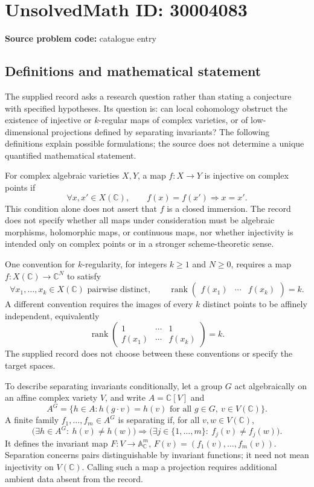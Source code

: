 \documentclass[11pt]{article}
\newcommand{\C}{\mathbb{C}}
\newcommand{\A}{\mathbb{A}}
\begin{document}
\section*{UnsolvedMath ID: 30004083}
\textbf{Source problem code:} catalogue entry
\subsection{Definitions and mathematical statement}
The supplied record asks a research question rather than stating a conjecture with specified hypotheses. Its question is: can local cohomology obstruct the existence of injective or \(k\)-regular maps of complex varieties, or of low-dimensional projections defined by separating invariants? The following definitions explain possible formulations; the source does not determine a unique quantified mathematical statement.

For complex algebraic varieties \(X,Y\), a map \(f:X\to Y\) is injective on complex points if
\[
\forall x,x'\in X(\C),\qquad f(x)=f(x')\Longrightarrow x=x'.
\]
This condition alone does not assert that \(f\) is a closed immersion. The record does not specify whether all maps under consideration must be algebraic morphisms, holomorphic maps, or continuous maps, nor whether injectivity is intended only on complex points or in a stronger scheme-theoretic sense.

One convention for \(k\)-regularity, for integers \(k\geq 1\) and \(N\geq 0\), requires a map \(f:X(\C)\to\C^N\) to satisfy
\[
\forall x_1,\ldots,x_k\in X(\C)\text{ pairwise distinct},\qquad
\operatorname{rank}\begin{pmatrix}f(x_1)&\cdots&f(x_k)\end{pmatrix}=k.
\]
A different convention requires the images of every \(k\) distinct points to be affinely independent, equivalently
\[
\operatorname{rank}\begin{pmatrix}1&\cdots&1\\ f(x_1)&\cdots&f(x_k)\end{pmatrix}=k.
\]
The supplied record does not choose between these conventions or specify the target spaces.

To describe separating invariants conditionally, let a group \(G\) act algebraically on an affine complex variety \(V\), and write \(A=\C[V]\) and
\[
A^G=\{h\in A: h(g\cdot v)=h(v)\text{ for all }g\in G,\ v\in V(\C)\}.
\]
A finite family \(f_1,\ldots,f_m\in A^G\) is separating if, for all \(v,w\in V(\C)\),
\[
\bigl(\exists h\in A^G:\ h(v)\ne h(w)\bigr)
\Longrightarrow
\bigl(\exists j\in\{1,\ldots,m\}:\ f_j(v)\ne f_j(w)\bigr).
\]
It defines the invariant map \(F:V\to\A^m_{\C}\), \(F(v)=(f_1(v),\ldots,f_m(v))\). Separation concerns pairs distinguishable by invariant functions; it need not mean injectivity on \(V(\C)\). Calling such a map a projection requires additional ambient data absent from the record.
\end{document}
